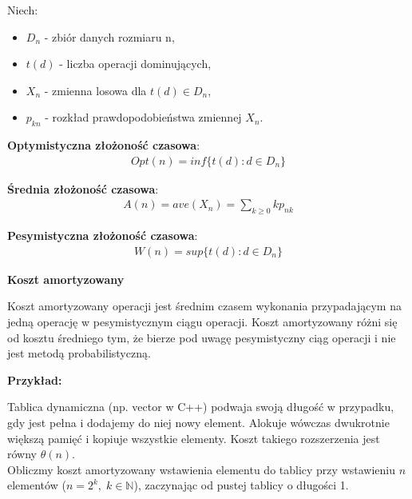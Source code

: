 \documentclass[main.tex]{subfiles}
\begin{document}
    \begin{definition}
        Niech:
        \begin{itemize}
            \item $D_n$ - zbiór danych rozmiaru n,
            \item $t(d)$ - liczba operacji dominujących,
            \item $X_n$ - zmienna losowa dla $t(d) \in D_n$,
            \item $p_{kn}$ - rozkład prawdopodobieństwa zmiennej $X_n$.
        \end{itemize}

        \textbf{Optymistyczna złożoność czasowa}:
        \begin{align*}
            Opt(n) = inf\{t(d) : d \in D_n\}
        \end{align*}

        \textbf{Średnia złożoność czasowa}:
        \begin{align*}
            A(n) = ave(X_n) = \sum_{k \geq 0}kp_{nk}
        \end{align*}

        \textbf{Pesymistyczna złożoność czasowa}:
        \begin{align*}
            W(n) = sup\{t(d) : d \in D_n\}
        \end{align*}
    \end{definition}

    \begin{definition}
        \textbf{Koszt amortyzowany}

        Koszt amortyzowany operacji jest średnim czasem wykonania przypadającym na jedną operację w pesymistycznym ciągu operacji. Koszt amortyzowany różni się od kosztu średniego tym, że bierze pod uwagę pesymistyczny ciąg operacji i nie jest metodą probabilistyczną.

    \end{definition}

    \textbf{Przykład:}

    Tablica dynamiczna (np. vector w C++) podwaja swoją długość w przypadku, gdy jest pełna i dodajemy do niej nowy element.
    Alokuje wówczas dwukrotnie większą pamięć i kopiuje wszystkie elementy.
    Koszt takiego rozszerzenia jest równy $\theta(n)$.\\

    Obliczmy koszt amortyzowany wstawienia elementu do tablicy przy wstawieniu $n$ elementów ($n = 2^k,\; k \in \mathbb{N}$),
    zaczynając od pustej tablicy o długości 1.
\end{document}
